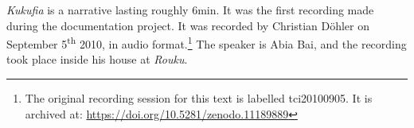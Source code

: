 \textit{Kukufia} is a narrative lasting roughly 6min. It was the first recording made during the documentation project. It was recorded by Christian Döhler on September 5\textsuperscript{th} 2010, in audio format.\footnote{The original recording session for this text is labelled tci20100905. It is archived at: \href{https://doi.org/10.5281/zenodo.11189889}{https://doi.org/10.5281/zenodo.11189889}} The speaker is Abia Bai, and the recording took place inside his house at \textit{Rouku}.